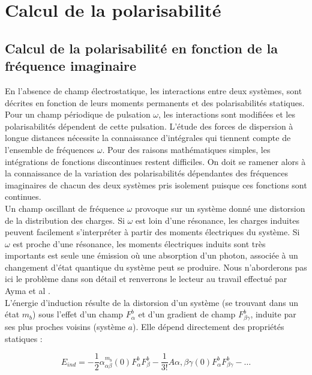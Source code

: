 \chapter[Calcul de la polarisabilité]{Calcul de la polarisabilité}
\minitoc
\restoregeometry

\newpage
	
\section{Calcul de la polarisabilité en fonction de la fréquence imaginaire}
	
En l'absence de champ électrostatique, les interactions entre deux systèmes, sont décrites en fonction de leurs moments permanents et des polarisabilités statiques. Pour un champ périodique de pulsation $\omega$, les interactions sont modifiées et les polarisabilités dépendent de cette pulsation. L'étude des forces de dispersion à longue distances nécessite la connaissance d'intégrales qui tiennent compte de l'ensemble de fréquences $\omega$. Pour des raisons mathématiques simples, les intégrations de fonctions discontinues restent difficiles. On doit se ramener alors à la connaissance de la variation des polarisabilités dépendantes des fréquences imaginaires de chacun des deux systèmes pris isolement puisque ces fonctions sont continues.\\
	
Un champ oscillant de fréquence $\omega$ provoque sur un système donné une distorsion de la distribution des charges. Si $\omega$ est loin d'une résonance, les charges induites peuvent facilement s'interpréter à partir des moments électriques du système. Si $\omega$ est proche d'une résonance, les moments électriques induits sont très importants est seule une émission où une absorption d'un photon, associée à un changement d'état quantique du système peut se produire. Nous n'aborderons pas ici le problème dans son détail et renverrons le lecteur au travail effectué par Ayma et al \cite{ayma1997etude}.\\
	
	
L'énergie d'induction résulte de la distorsion d'un système (se trouvant dans un état $m_{b}$) sous l'effet d'un champ $F_{\alpha}^{b}$ et d'un gradient de champ $F_{\beta\gamma}^{b}$, induite par ses plus proches voisins (système $a$). Elle dépend directement des propriétés statiques : 
	
\begin{equation}
E_{ind} = -\frac{1}{2} \alpha_{\alpha\beta}^{m_{b}} (0) F_{\alpha}^{b} F_{\beta}^{b} - \frac{1}{3!} A\alpha , \beta\gamma (0) F_{\alpha}^{b} F_{\beta\gamma}^{b} - \ldots
\end{equation}
	
